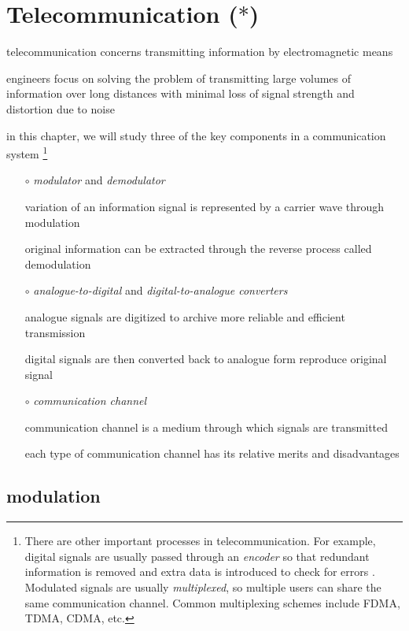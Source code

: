 \section{\texorpdfstring{Telecommunication ($\ast$)}{Telecommunication}}


telecommunication concerns transmitting information by electromagnetic means

engineers focus on solving the problem of transmitting large volumes of information over long distances with minimal loss of signal strength and distortion due to noise

in this chapter, we will study three of the key components in a communication system
\footnote{There are other important processes in telecommunication. For example, digital signals are usually passed through an \emph{encoder} so that redundant information is removed and extra data is introduced to check for errors . Modulated signals are usually \emph{multiplexed}, so multiple users can share the same communication channel. Common multiplexing schemes include FDMA, TDMA, CDMA, etc.}

\begin{itemize}[leftmargin=\parindent]
	\item[$\circ$] \emph{modulator} and \emph{demodulator}
	
	variation of an information signal is represented by a carrier wave through modulation
	
	original information can be extracted through the reverse process called demodulation
	
	\item[$\circ$] \emph{analogue-to-digital} and \emph{digital-to-analogue converters}
	
	analogue signals are digitized to archive more reliable and efficient transmission
	
	digital signals are then converted back to analogue form reproduce original signal
	
	\item[$\circ$] \emph{communication channel}
	
	communication channel is a medium through which signals are transmitted
	
	each type of communication channel has its relative merits and disadvantages
\end{itemize}



\subsection{modulation}

